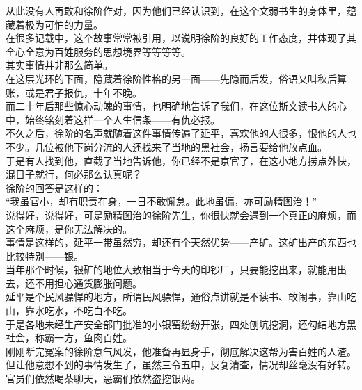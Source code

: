\begin{multicols}{\theparacolNo}
从此没有人再敢和徐阶作对，因为他们已经认识到，在这个文弱书生的身体里，蕴藏着极为可怕的力量。\\

在很多记载中，这个故事常常被引用，以说明徐阶的良好的工作态度，并体现了其全心全意为百姓服务的思想境界等等等等。\\

其实事情并非那么简单。\\

在这层光环的下面，隐藏着徐阶性格的另一面——先隐而后发，俗语又叫秋后算账，或是君子报仇，十年不晚。\\

而二十年后那些惊心动魄的事情，也明确地告诉了我们，在这位斯文读书人的心中，始终铭刻着这样一个人生信条——有仇必报。\\

不久之后，徐阶的名声就随着这件事情传遍了延平，喜欢他的人很多，恨他的人也不少。几位被他下岗分流的人还找来了当地的黑社会，扬言要给他放点血。\\

于是有人找到他，直截了当地告诉他，你已经不是京官了，在这小地方捞点外快，混日子就行，何必那么认真呢？\\

徐阶的回答是这样的：\\

“我虽官小，却有职责在身，一日不敢懈怠。此地虽偏，亦可励精图治！”\\

说得好，说得好，可是励精图治的徐阶先生，你很快就会遇到一个真正的麻烦，而这个麻烦，是你无法解决的。\\

事情是这样的，延平一带虽然穷，却还有个天然优势——产矿。这矿出产的东西也比较特别——银。\\

当年那个时候，银矿的地位大致相当于今天的印钞厂，只要能挖出来，就能用出去，还不用担心通货膨胀问题。\\

延平是个民风骠悍的地方，所谓民风骠悍，通俗点讲就是不读书、敢闹事，靠山吃山，靠水吃水，不吃白不吃。\\

于是各地未经生产安全部门批准的小银窑纷纷开张，四处刨坑挖洞，还勾结地方黑社会，称霸一方，鱼肉百姓。\\

刚刚断完冤案的徐阶意气风发，他准备再显身手，彻底解决这帮为害百姓的人渣。但让他意想不到的事情发生了，虽然三令五申，反复清查，情况却丝毫没有好转。官员们依然喝茶聊天，恶霸们依然盗挖银两。\\


\end{multicols}
